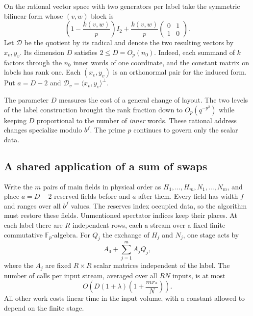 On the rational vector space with two generators per label take the
symmetric bilinear form whose $(v,w)$ block is
\begin{equation}\label{eq:interchange-gram}
 \left(1-\frac{k(v,w)}p\right) I_2+
   \frac{k(v,w)}p\begin{pmatrix}0&1\\1&0\end{pmatrix}.
\end{equation}
Let $\mathcal D$ be the quotient by its radical and denote the two
resulting vectors by $x_v,y_v$. Its dimension $D$ satisfies
$2\le D=O_p(n_0)$. Indeed, each summand of $k$ factors through
the $n_0$ inner words of one coordinate, and the constant matrix on
labels has rank one. Each $(x_v,y_v)$ is an orthonormal pair for the
induced form. Put $a=D-2$ and
$\mathcal D_v=\langle x_v,y_v\rangle^\perp$.

The parameter $D$ measures the cost of a general change of layout.
The two levels of the label construction brought the rank fraction
down to $O_p(q^{-p^2})$ while keeping $D$ proportional to the number
of \emph{inner} words. These rational address changes specialize
modulo $b^f$. The prime $p$ continues to govern only the scalar data.

\subsection{A shared application of a sum of swaps}

Write the $m$ pairs of main fields in physical order as
$H_1,\ldots,H_m,N_1,\ldots,N_m$, and place $a=D-2$ reserved fields
before and $a$ after them. Every field has width $f$ and ranges over
all $b^f$ values. The reserves index occupied data, so the algorithm
must restore these fields. Unmentioned spectator indices keep their
places. At each label there are $R$ independent rows, each a stream
over a fixed finite commutative $\mathbb F_p$-algebra. For
$Q_j$ the exchange of $H_j$ and $N_j$, one stage acts by
\begin{equation}\label{eq:interchange-pencil}
                   A_0+\sum_{j=1}^m A_j Q_j ,
\end{equation}
where the $A_j$ are fixed $R\times R$ scalar matrices independent of
the label. The number of calls per input stream, averaged over all
$RN$ inputs, is at most
\begin{equation}\label{eq:interchange-stage-cost}
            O\!\left(D(1+\lambda)
                  \left(1+\frac{m r_*}{N}\right)\right).
\end{equation}
All other work costs linear time in the input volume, with a constant
allowed to depend on the finite stage.

